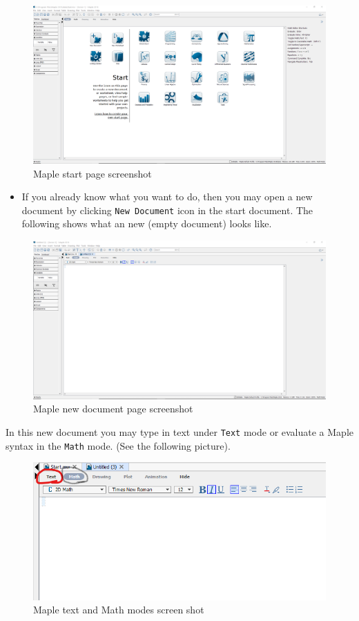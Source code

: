 \documentclass[]{book}
\providecommand{\tightlist}{%
  \setlength{\itemsep}{0pt}\setlength{\parskip}{0pt}}
\theoremstyle{definition}
\theoremstyle{definition}
\theoremstyle{definition}
\theoremstyle{remark}
\begin{document}
\begin{figure}
\centering
\includegraphics{figs/Maple-Start.png}
\caption{Maple start page screenshot}
\end{figure}

\begin{itemize}
\tightlist
\item
  If you already know what you want to do, then you may open a new document by clicking \texttt{New\ Document} icon in the start document. The following shows what an new (empty document) looks like.
\end{itemize}

\begin{figure}
\centering
\includegraphics{figs/Maple-New-Doc.png}
\caption{Maple new document page screenshot}
\end{figure}

In this new document you may type in text under \texttt{Text} mode or evaluate a Maple syntax in the \texttt{Math} mode. (See the following picture).

\begin{figure}
\centering
\includegraphics{figs/Text-Math-Mode.png}
\caption{Maple text and Math modes screen shot}
\end{figure}
\end{document}
